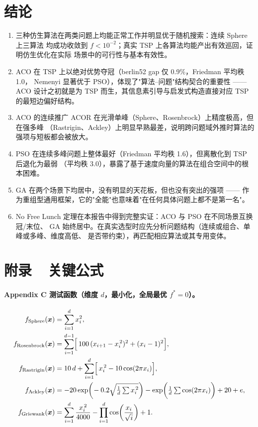 \documentclass[12pt,a4paper,fontset=windows]{ctexart}
\begin{document}
\section{结论}
\label{sec:conclusion}

\begin{enumerate}
  \item 三种仿生算法在两类问题上均能正常工作并明显优于随机搜索：连续 Sphere 上三算法
        均成功收敛到 $f<10^{-2}$；真实 TSP 上各算法均能产出有效巡回，证明仿生优化在实际
        场景中的可行性与基本有效性。
  \item ACO 在 TSP 上以绝对优势夺冠（berlin52 gap 仅 0.9\%，Friedman 平均秩 1.0，
        Nemenyi 显著优于 PSO），体现了"算法--问题"结构契合的重要性 ——
        ACO 设计之初就是为 TSP 而生，其信息素引导与启发式构造直接对应 TSP 的最短边偏好结构。
  \item ACO 的连续推广 ACOR 在光滑单峰（Sphere、Rosenbrock）上精度极高，但在强多峰
        （Rastrigin、Ackley）上明显早熟最差，说明跨问题域外推时算法的强项与短板都会被放大。
  \item PSO 在连续多峰问题上整体最好（Friedman 平均秩 1.6），但离散化到 TSP 后退化为最弱
        （平均秩 3.0），暴露了基于速度向量的算法在组合空间中的根本困难。
  \item GA 在两个场景下均居中，没有明显的天花板，但也没有突出的强项 ——
        作为重组型通用框架，它的"全能"也意味着"在任何具体问题上都不是第一名"。
  \item No Free Lunch 定理在本报告中得到完整实证：ACO 与 PSO 在不同场景互换冠/末位、
        GA 始终居中。在真实选型时应先分析问题结构（连续或组合、单峰或多峰、维度高低、
        是否带约束），再匹配相应算法或其专用变体。
\end{enumerate}

\appendix
\section*{附录\ \ 关键公式}

\paragraph{Appendix C 测试函数（维度 $d$，最小化，全局最优 $f^{\ast}=0$）。}
\begin{align*}
  f_{\rm Sphere}(\bm{x})     &= \sum_{i=1}^{d} x_i^2, \\
  f_{\rm Rosenbrock}(\bm{x}) &= \sum_{i=1}^{d-1}\!\Big[\,100\,(x_{i+1}-x_i^{\,2})^2+(x_i-1)^2\Big], \\
  f_{\rm Rastrigin}(\bm{x})  &= 10\,d + \sum_{i=1}^{d}\!\Big[\,x_i^{\,2}-10\cos(2\pi x_i)\Big], \\
  f_{\rm Ackley}(\bm{x})     &= -20\exp\!\bigg(\!-0.2\sqrt{\tfrac{1}{d}\textstyle\sum x_i^{\,2}}\bigg)
                               -\exp\!\bigg(\tfrac{1}{d}\textstyle\sum\cos(2\pi x_i)\bigg) + 20 + e, \\
  f_{\rm Griewank}(\bm{x})   &= \sum_{i=1}^{d}\frac{x_i^{\,2}}{4000} - \prod_{i=1}^{d}\cos\!\left(\frac{x_i}{\sqrt{i}}\right) + 1.
\end{align*}
\end{document}
